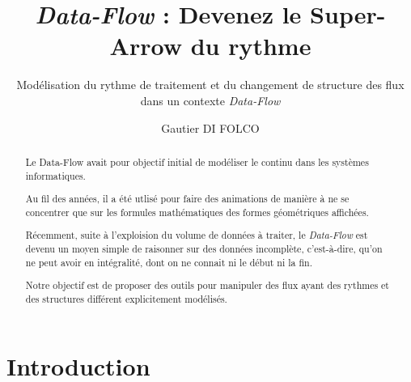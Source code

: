 \documentclass{llncs}
\begin{document}
\title{\emph{Data-Flow} : Devenez le Super-Arrow du rythme}


\subtitle{Modélisation du rythme de traitement et du changement de structure des flux dans un contexte \emph{Data-Flow}}


\author{Gautier DI FOLCO}







\maketitle

\begin{abstract}
Le Data-Flow avait pour objectif initial de modéliser le continu dans les
systèmes informatiques.

Au fil des années, il a été utlisé pour faire des animations de manière à ne se
concentrer que sur les formules mathématiques des formes géométriques affichées.

Récemment, suite à l'exploision du volume de données à traiter, le \emph{Data-Flow}
est devenu un moyen simple de raisonner sur des données incomplète, c'est-à-dire,
qu'on ne peut avoir en intégralité, dont on ne connait ni le début ni la fin.

Notre objectif est de proposer des outils pour manipuler des flux ayant des
rythmes et des structures différent explicitement modélisés.
\end{abstract}

\section{Introduction}
\end{document}
